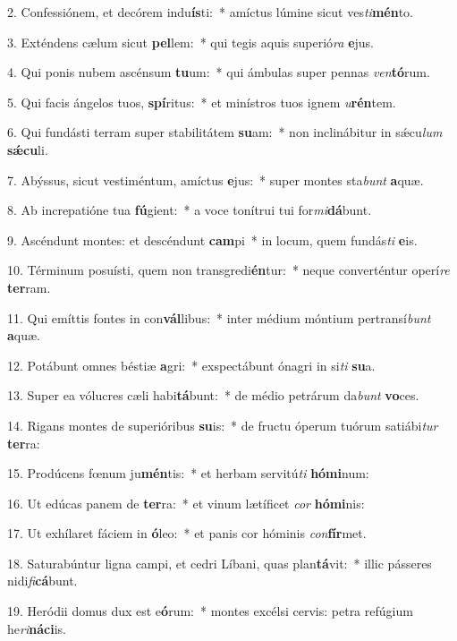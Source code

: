 2. Confessiónem, et decórem indu\textbf{ís}ti:~*  amíctus lúmine sicut ves\textit{ti}\textbf{mén}to.\

3. Exténdens cælum sicut \textbf{pel}lem:~*  qui tegis aquis superió\textit{ra} \textbf{e}jus.\

4. Qui ponis nubem ascénsum \textbf{tu}um:~*  qui ámbulas super pennas \textit{ven}\textbf{tó}rum.\

5. Qui facis ángelos tuos, \textbf{spí}ritus:~*  et minístros tuos ignem \textit{u}\textbf{rén}tem.\

6. Qui fundásti terram super stabilitátem \textbf{su}am:~*  non inclinábitur in sǽcu\textit{lum} \textbf{sǽ}\textbf{cu}li.\

7. Abýssus, sicut vestiméntum, amíctus \textbf{e}jus:~*  super montes sta\textit{bunt} \textbf{a}quæ.\

8. Ab increpatióne tua \textbf{fú}gient:~*  a voce tonítrui tui for\textit{mi}\textbf{dá}bunt.\

9. Ascéndunt montes: et descéndunt \textbf{cam}pi~*  in locum, quem fundás\textit{ti} \textbf{e}is.\

10. Términum posuísti, quem non transgredi\textbf{én}tur:~*  neque converténtur operí\textit{re} \textbf{ter}ram.\

11. Qui emíttis fontes in con\textbf{vál}libus:~*  inter médium móntium pertransí\textit{bunt} \textbf{a}quæ.\

12. Potábunt omnes béstiæ \textbf{a}gri:~*  exspectábunt ónagri in si\textit{ti} \textbf{su}a.\

13. Super ea vólucres cæli habi\textbf{tá}bunt:~*  de médio petrárum da\textit{bunt} \textbf{vo}ces.\

14. Rigans montes de superióribus \textbf{su}is:~*  de fructu óperum tuórum satiábi\textit{tur} \textbf{ter}ra:\

15. Prodúcens fœnum ju\textbf{mén}tis:~*  et herbam servitú\textit{ti} \textbf{hó}\textbf{mi}num:\

16. Ut edúcas panem de \textbf{ter}ra:~*  et vinum lætíficet \textit{cor} \textbf{hó}\textbf{mi}nis:\

17. Ut exhílaret fáciem in \textbf{ó}leo:~*  et panis cor hóminis \textit{con}\textbf{fír}met.\

18. Saturabúntur ligna campi, et cedri Líbani, quas plan\textbf{tá}vit:~*  illic pásseres nidi\textit{fi}\textbf{cá}bunt.\

19. Heródii domus dux est e\textbf{ó}rum:~*  montes excélsi cervis: petra refúgium he\textit{ri}\textbf{ná}\textbf{ci}is.\

